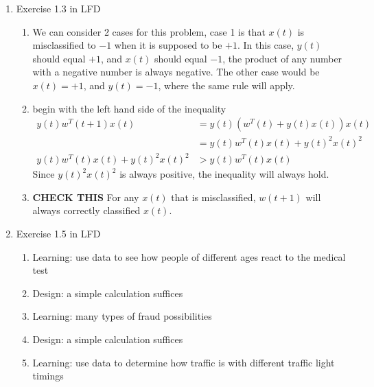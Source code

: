 \documentclass{article}
\begin{document}
    \begin{enumerate}
        \item Exercise 1.3 in LFD
        \begin{enumerate}[label=(\alph*)]
            \item We can consider 2 cases for this problem, case 1 is that $x(t)$ is misclassified to $-1$ when it is supposed to be $+1$. In this case, $y(t)$ should equal $+1$, and $x(t)$ should equal $-1$, the product of any number with a negative number is always negative. The other case would be $x(t) = +1$, and $y(t) = -1$, where the same rule will apply.
            \item begin with the left hand side of the inequality
            \begin{align*}
                y(t)w^T(t+1)x(t) &= y(t)(w^T(t) + y(t)x(t))x(t)\\
                &= y(t)w^T(t)x(t) + y(t)^2x(t)^2\\
                y(t)w^T(t)x(t) + y(t)^2x(t)^2 & > y(t)w^T(t)x(t)
            \end{align*}
            Since $y(t)^2x(t)^2$ is always positive, the inequality will always hold.
            \item \textbf{CHECK THIS} For any $x(t)$ that is misclassified, $w(t+1)$ will always correctly classified $x(t)$.
        \end{enumerate}

        \item Exercise 1.5 in LFD
        \begin{enumerate}[label=(\alph*)]
            \item Learning: use data to see how people of different ages react to the medical test
            \item Design: a simple calculation suffices
            \item Learning: many types of fraud possibilities
            \item Design: a simple calculation suffices
            \item Learning: use data to determine how traffic is with different traffic light timings
        \end{enumerate}


\end{enumerate}
\end{document}
